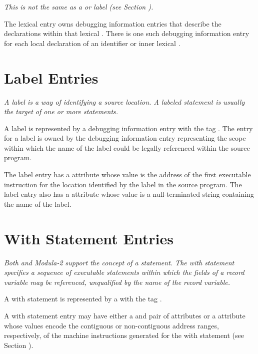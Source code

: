 \textit{This is not the same as a  or 
 label (see Section ).}

The lexical  entry owns debugging 
information entries that describe the declarations 
within that lexical . There is
one such debugging information entry for each local declaration
of an identifier or inner lexical .

\section{Label Entries}
\label{chap:labelentries}
\textit{A label is a way of identifying a source location.
A labeled statement is usually the target of one or more 
 statements.}

A label is represented by a debugging information entry with
 the tag \DWTAGlabelTARG. 
The entry for a label is owned by
the debugging information entry representing the scope within
which the name of the label could be legally referenced within
the source program.

The label entry has a \DWATlowpc{} attribute whose value
is the address of the first executable instruction for the 
location identified by the label in
the source program.  The label entry also has a 
\DWATname{} attribute 
whose value is a null-terminated string containing
the name of the label.   


\section{With Statement Entries}
\label{chap:withstatemententries}

\textit{Both  and 
Modula-2 support the concept of a 
statement. The with statement specifies a sequence of
executable statements within which the fields of a record
variable may be referenced, unqualified by the name of the
record variable.}

A with statement is represented by a
with the tag \DWTAGwithstmtTARG.

A with statement entry may have either a 
\DWATlowpc{} and
\DWAThighpc{} pair of attributes 
or a
\DWATranges{} attribute
whose values encode the contiguous or non-contiguous address
ranges, respectively, of the machine instructions generated
for the with statement 
(see Section ).

